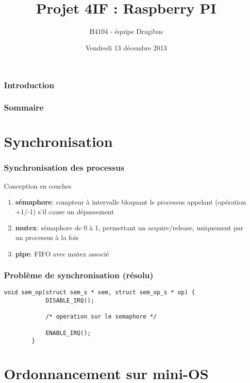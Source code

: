 \documentclass{beamer}
\title[Presentation SEA]{Projet 4IF : Raspberry PI}
\author{H4104 - équipe Dragibus}
\institute{INSA de Lyon}
\date{Vendredi 13 décembre 2013}
\begin{document}
\begin{frame}
    \titlepage
\end{frame}

\begin{frame}
    \frametitle{Introduction}

\end{frame}

\begin{frame}
    \frametitle{Sommaire}
    \tableofcontents
\end{frame}

\section{Synchronisation}

\begin{frame}
    \frametitle{Synchronisation des processus}

    \begin{center}
        \huge Conception en couches
    \end{center}

    \begin{enumerate}
        \item<2-> \textbf{sémaphore}: compteur à intervalle bloquant le
            processus appelant (opération +1/-1) s'il cause un dépassement
        \item<3-> \textbf{mutex}: sémaphore de 0 à 1, permettant un
            acquire/release, uniquement par un processus à la fois
        \item<4-> \textbf{pipe}: FIFO avec mutex associé
    \end{enumerate}
\end{frame}

\begin{frame}[fragile]
    \frametitle{Problème de synchronisation (résolu)}

    \begin{lstlisting}[caption=Opération atomique sur un sémaphore]
        void sem_op(struct sem_s * sem, struct sem_op_s * op) {
            DISABLE_IRQ();

            /* operation sur le semaphore */

            ENABLE_IRQ();
        }
    \end{lstlisting}
\end{frame}

\section{Ordonnancement sur mini-OS}
\end{document}
